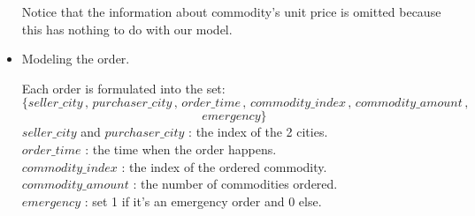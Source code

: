 \documentclass[11pt, a4paper]{article} %
\begin{document}
\begin{itemize}
		Notice that the information about commodity's unit price is omitted because this has nothing to do with our model.\\
		\item Modeling the order.\par
		Each order is formulated into the set:
		$$
		\{seller\_city\,,\, purchaser\_city\,,\, order\_time\,,\, commodity\_index\,,\, commodity\_amount\,,\,
		$$
		$$
		emergency\}
		$$
		$seller\_city$ and $purchaser\_city$ : the index of the 2 cities.\\
		$order\_time$ : the time when the order happens.\\
		$commodity\_index$ : the index of the ordered commodity.\\
		$commodity\_amount$ : the number of commodities ordered.\\
		$emergency$ : set 1 if it's an emergency order and 0 else.
	\end{itemize}
	
\end{document}
